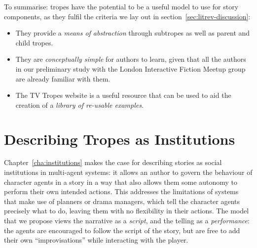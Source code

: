 \documentclass[11pt]{report}
\begin{document}
To summarise: tropes have the potential to be a useful model to use for story
components, as they fulfil the criteria we lay out in
section~\ref{sec:litrev-discussion}:

\begin{itemize}
\item They provide a \emph{means of abstraction} through subtropes as well as parent and child
  tropes.
\item They are \emph{conceptually simple} for authors to learn, given that
all the authors in our preliminary study with the London Interactive Fiction
Meetup group are already familiar with them.
\item The TV Tropes website is a useful resource that can be used to aid the
  creation of a \emph{library of re-usable examples}.
\end{itemize}



\section{Describing Tropes as Institutions} %
\label{sec:tropes-as-insts}
Chapter~\ref{cha:institutions} makes the case for describing stories as social
institutions in multi-agent systems: it allows an author to govern the
behaviour of character agents in a story in a way that also allows them some
autonomy to perform their own intended actions.
This addresses the limitations of systems that make use of planners or drama
managers, which tell the character agents precisely what to do,
leaving them with no flexibility in their actions. The model
that we propose views the narrative as a \emph{script}, and the telling as a
\emph{performance}: the agents are encouraged to follow the script of the story,
but are free to add their own ``improvisations'' while interacting with the player.
\end{document}
